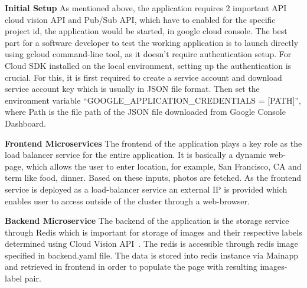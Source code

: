 \item \textbf{Initial Setup} As mentioned above, the application
  requires 2 important API cloud vision API and Pub/Sub API, which
  have to enabled for the specific project id, the application would
  be started, in google cloud console. The best part for a software
  developer to test the working application is to launch directly
  using gcloud command-line tool, as it doesn’t require authentication
  setup.  For Cloud SDK installed on the local environment, setting up
  the authentication is crucial. For this, it is first required to
  create a service account and download service account key which is
  usually in JSON file format. Then set the environment variable
  ``GOOGLE_APPLICATION_CREDENTIALS = [PATH]'', where Path is the file path
  of the JSON file downloaded from Google Console Dashboard.

\item \textbf{Frontend Microservices} The frontend of the application
  plays a key role as the load balancer service for the entire
  application. It is basically a dynamic web-page, which allows the
  user to enter location, for example, San Francisco, CA and term
  like food, dinner. Based on these inputs, photos are fetched. As
  the frontend service is deployed as a load-balancer service an
  external IP is provided which enables user to access outside of the
  cluster through a web-browser.

\item \textbf{Backend Microservice} The backend of the application is
  the storage service through Redis which is important for storage of
  images and their respective labels determined using Cloud Vision
  API~\cite{hid-sp18-602-redis}. The redis is accessible through redis
  image specified in backend.yaml file. The data is stored into redis
  instance via Mainapp and retrieved in frontend in order to populate
  the page with resulting images-label pair.

